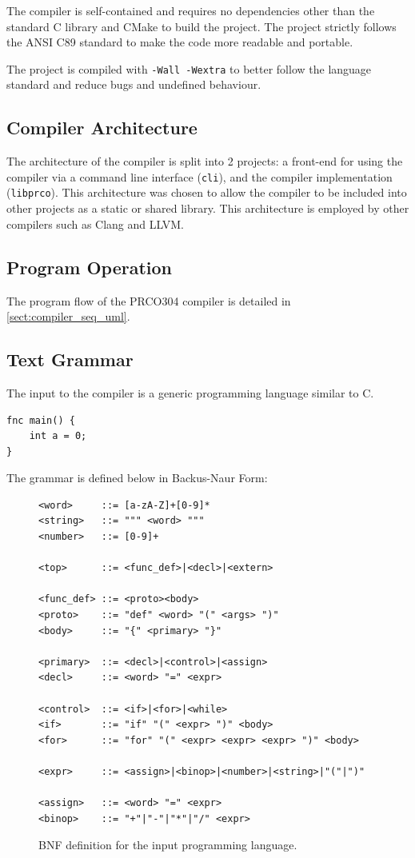 \documentclass[11pt,a4paper]{report}
\newcommand{\scname}{PRCO304}
\begin{document}
The compiler is self-contained and requires no dependencies other than the standard C library and CMake to build the project. The project strictly follows the ANSI C89 standard to make the code more readable and portable. 

The project is compiled with \verb|-Wall -Wextra| to better follow the language standard and reduce bugs and undefined behaviour.

\subsection{Compiler Architecture}
The architecture of the compiler is split into 2 projects: a front-end for using the compiler via a command line interface (\verb|cli|), and the compiler implementation (\verb|libprco|). This architecture was chosen to allow the compiler to be included into other projects as a static or shared library. This architecture is employed by other compilers such as Clang and LLVM. 


\subsection{Program Operation}
The program flow of the \scname{} compiler is detailed in {} \ref{sect:compiler_seq_uml}. 



\subsection{Text Grammar}
\label{sect:compiler_grammar}
The input to the compiler is a generic programming language similar to C.

\begin{verbatim}
fnc main() {
    int a = 0;
}
\end{verbatim}

The grammar is defined below in Backus-Naur Form:
\begin{figure}[H]
\begin{verbatim}
<word>     ::= [a-zA-Z]+[0-9]*
<string>   ::= """ <word> """
<number>   ::= [0-9]+

<top>      ::= <func_def>|<decl>|<extern>

<func_def> ::= <proto><body>
<proto>    ::= "def" <word> "(" <args> ")" 
<body>     ::= "{" <primary> "}"

<primary>  ::= <decl>|<control>|<assign>
<decl>     ::= <word> "=" <expr>

<control>  ::= <if>|<for>|<while>
<if>       ::= "if" "(" <expr> ")" <body>
<for>      ::= "for" "(" <expr> <expr> <expr> ")" <body>

<expr>     ::= <assign>|<binop>|<number>|<string>|"("|")"

<assign>   ::= <word> "=" <expr>
<binop>    ::= "+"|"-"|"*"|"/" <expr>
\end{verbatim}
\label{fig:compiler_grammar_bnf}
\caption{BNF definition for the input programming language.}
\end{figure}
\end{document}
